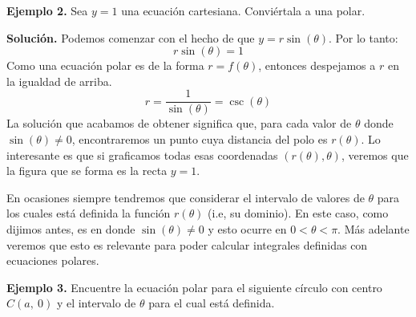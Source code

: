 \documentclass[12pt]{article}
\begin{document}
\textbf{Ejemplo 2.} Sea $y = 1$ una ecuación cartesiana. Conviértala a una polar.

\textbf{Solución.} Podemos comenzar con el hecho de que $y = r \sin(\theta)$. Por lo tanto:
\[
  r \sin(\theta) = 1
\]
Como una ecuación polar es de la forma $r = f(\theta)$, entonces despejamos a $r$ en la igualdad de arriba.
\[
  r = \frac{1}{\sin(\theta)} = \csc(\theta)
\]
La solución que acabamos de obtener significa que, para cada valor de $\theta$ donde $\sin(\theta) \neq 0$, encontraremos un punto cuya distancia del polo es $r(\theta)$. Lo interesante es que si graficamos todas esas coordenadas $(r(\theta), \theta)$, veremos que la figura que se forma es la recta $y = 1$.

\begin{figure}[hbt!]

\centering


\end{figure}

En ocasiones siempre tendremos que considerar el intervalo de valores de $\theta$ para los cuales está definida la función $r(\theta)$ (i.e, su dominio). En este caso, como dijimos antes, es en donde $\sin(\theta) \neq 0$ y esto ocurre en $0 < \theta < \pi$. Más adelante veremos que esto es relevante para poder calcular integrales definidas con ecuaciones polares.

\textbf{Ejemplo 3.} Encuentre la ecuación polar para el siguiente círculo con centro $C(a, \ 0)$ y el intervalo de $\theta$ para el cual está definida.
\end{document}

